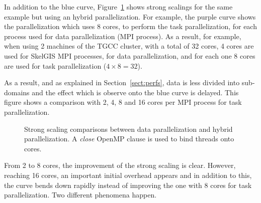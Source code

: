 \medskip
In addition to the blue curve, Figure~\ref{fig:close} shows strong scalings for the same example but using an hybrid parallelization. For example, the purple curve shows the parallelization which uses 8 cores, to perform the task parallelization, for each process used for data parallelization (\ie MPI process). As a result, for example, when using 2 machines of the TGCC cluster, with a total of 32 cores, 4 cores are used for SkelGIS MPI processes, for data parallelization, and for each one 8 cores are used for task parallelization ($4 \times 8 = 32$).

As a result, and as explained in Section~\ref{sect:perfs}, data is less divided into sub-domains and the effect which is observe onto the blue curve is delayed. This figure shows a comparison with 2, 4, 8 and 16 cores per MPI process for task parallelization.

\begin{figure}[!h]\begin{center}
  \caption{Strong scaling comparisons between data parallelization and hybrid parallelization. A \emph{close} OpenMP clause is used to bind threads onto cores.}
  \label{fig:close}
\end{center}\end{figure}

From 2 to 8 cores, the improvement of the strong scaling is clear. However, reaching 16 cores, an important initial overhead appears and in addition to this, the curve bends down rapidly instead of improving the one with 8 cores for task parallelization. Two different phenomena happen.

